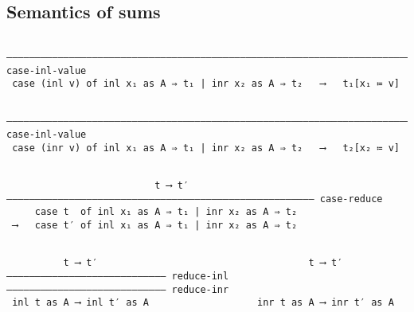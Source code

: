 \documentclass[11pt]{article}
\theoremstyle{definition}
\begin{document}
\subsection{Semantics of sums}
\label{sec:orgb12a042}

\begin{verbatim}

–––––––––––––––––––––––––––––––––––––––––––––––––––––––––––––––––––––––––– case-inl-value
 case (inl v) of inl x₁ as A ⇒ t₁ | inr x₂ as A ⇒ t₂   ⟶   t₁[x₁ ≔ v]

\end{verbatim}

\begin{verbatim}

––––––––––––––––––––––––––––––––––––––––––––––––––––––––––––––––––––––––––– case-inl-value
 case (inr v) of inl x₁ as A ⇒ t₁ | inr x₂ as A ⇒ t₂   ⟶   t₂[x₂ ≔ v]

\end{verbatim}

\begin{verbatim}

                          t ⟶ t′
–––––––––––––––––––––––––––––––––––––––––––––––––––––– case-reduce
     case t  of inl x₁ as A ⇒ t₁ | inr x₂ as A ⇒ t₂
 ⟶   case t′ of inl x₁ as A ⇒ t₁ | inr x₂ as A ⇒ t₂

\end{verbatim}

\begin{verbatim}

          t ⟶ t′                                     t ⟶ t′
–––––––––––––––––––––––––––– reduce-inl    –––––––––––––––––––––––––––– reduce-inr
 inl t as A ⟶ inl t′ as A                   inr t as A ⟶ inr t′ as A

\end{verbatim}
\end{document}
